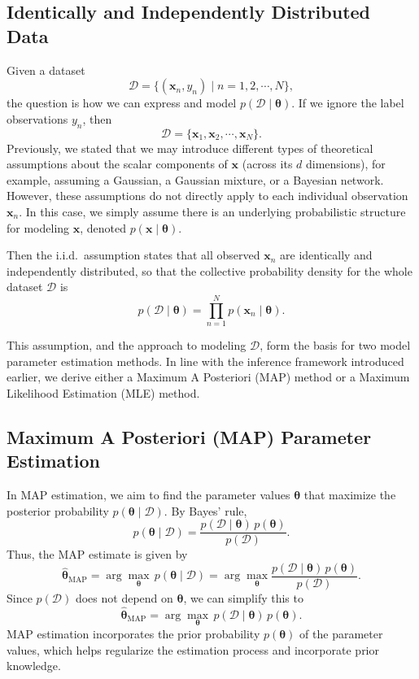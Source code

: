 \documentclass[12pt]{article}
\begin{document}
\subsection{Identically and Independently Distributed Data}
Given a dataset 
\[
\mathcal{D} = \{(\bm{x}_n, y_n) \mid n = 1, 2, \cdots, N \},
\]
the question is how we can express and model \(p(\mathcal{D} \mid \pmb{\theta})\). If we ignore the label observations \(y_n\), then
\[
\mathcal{D} = \{\bm{x}_1, \bm{x}_2, \cdots, \bm{x}_N \}.
\]
Previously, we stated that we may introduce different types of theoretical assumptions about the scalar components of \(\bm{x}\) (across its \(d\) dimensions), for example, assuming a Gaussian, a Gaussian mixture, or a Bayesian network. However, these assumptions do not directly apply to each individual observation \(\bm{x}_n\). In this case, we simply assume there is an underlying probabilistic structure for modeling \(\bm{x}\), denoted \(p(\bm{x}\mid\pmb{\theta})\). 

Then the i.i.d.\ assumption states that all observed \(\bm{x}_n\) are identically and independently distributed, so that the collective probability density for the whole dataset \(\mathcal{D}\) is
\begin{equation}
p(\mathcal{D} \mid \pmb{\theta}) = \prod_{n=1}^{N} p(\bm{x}_n \mid \pmb{\theta}).
\end{equation}

This assumption, and the approach to modeling \(\mathcal{D}\), form the basis for two model parameter estimation methods. In line with the inference framework introduced earlier, we derive either a Maximum A Posteriori (MAP) method or a Maximum Likelihood Estimation (MLE) method.

\subsection*{Maximum A Posteriori (MAP) Parameter Estimation}
In MAP estimation, we aim to find the parameter values \(\pmb{\theta}\) that maximize the posterior probability \(p(\pmb{\theta} \mid \mathcal{D})\). By Bayes' rule,
\begin{equation}
p(\pmb{\theta} \mid \mathcal{D}) = \frac{p(\mathcal{D} \mid \pmb{\theta}) \, p(\pmb{\theta})}{p(\mathcal{D})}.
\end{equation}
Thus, the MAP estimate is given by
\begin{equation}
\hat{\pmb{\theta}}_{\text{MAP}} = \arg\max_{\pmb{\theta}} \, p(\pmb{\theta} \mid \mathcal{D}) = \arg\max_{\pmb{\theta}} \frac{p(\mathcal{D} \mid \pmb{\theta}) \, p(\pmb{\theta})}{p(\mathcal{D})}.
\end{equation}
Since \(p(\mathcal{D})\) does not depend on \(\pmb{\theta}\), we can simplify this to
\begin{equation}
\hat{\pmb{\theta}}_{\text{MAP}} = \arg\max_{\pmb{\theta}} \, p(\mathcal{D} \mid \pmb{\theta}) \, p(\pmb{\theta}).
\end{equation}
MAP estimation incorporates the prior probability \(p(\pmb{\theta})\) of the parameter values, which helps regularize the estimation process and incorporate prior knowledge.
\end{document}
